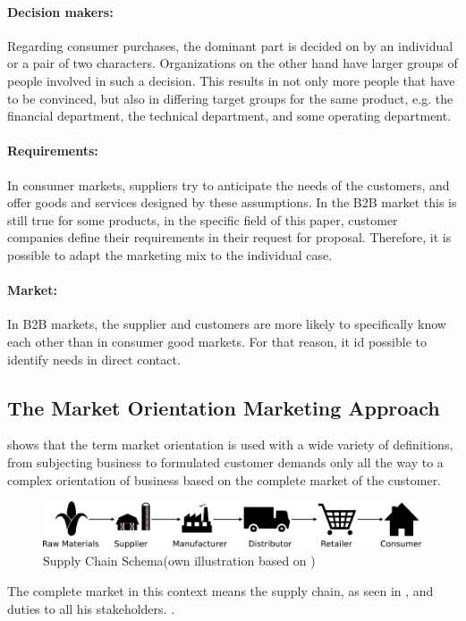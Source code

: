 \paragraph*{Decision makers:}Regarding consumer purchases, the dominant part is decided on by an individual or a pair of two characters. Organizations on the other hand have larger groups of people involved in such a decision. This results in not only more people that have to be convinced, but also in differing target groups for the same product, e.g. the financial department, the technical department, and some operating department. 
\paragraph*{Requirements:}In consumer markets, suppliers try to anticipate the needs of the customers, and offer goods and services designed by these assumptions. In the B2B market this is still true for some products, in the specific field of this paper, customer companies define their requirements in their request for proposal. Therefore, it is possible to adapt the marketing mix to the individual case.
\paragraph*{Market:}In B2B markets, the supplier and customers are more likely to specifically know each other than in consumer good markets. For that reason, it id possible to identify needs in direct contact.
\subsection{The Market Orientation Marketing Approach}
\textcite[9-10]{Claen.2016} shows that the term market orientation is used with a wide variety of definitions, from subjecting business to formulated customer demands only all the way to a complex orientation of business based on the complete market of the customer.
\begin{figure}[H]
	\includegraphics[width=\textwidth]{img/supplychain.pdf}
	\caption[Supply Chain Schema]{Supply Chain Schema(own illustration based on \protect\cite{SouthwestTech})}
    	\label{fig:supplychain}
\end{figure}
The complete market in this context means the supply chain, as seen in , and duties to all his stakeholders. \parencite[cf.][22-23]{Claen.2016}.
